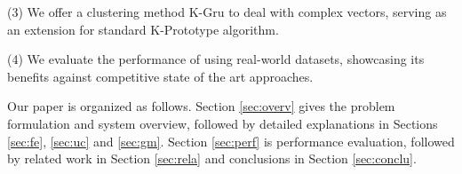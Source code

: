 \stab(3) We offer a clustering method K-Gru to deal with complex vectors, serving as an extension for standard K-Prototype algorithm.

\stab(4) We evaluate the performance of \sys{} using real-world datasets, showcasing its benefits against competitive state of the art approaches.



Our paper is organized as follows.
Section \ref{sec:overv} gives the problem formulation and system overview, followed by detailed explanations in Sections \ref{sec:fe}, \ref{sec:uc} and \ref{sec:gm}.
Section \ref{sec:perf} is performance evaluation, followed by
related work in Section \ref{sec:rela} and conclusions in Section \ref{sec:conclu}.











